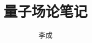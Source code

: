 \documentclass{book}
\author{李成}
\title{\textbf{{\Huge 量子场论笔记}}}
\begin{document}
\maketitle
~\vfill
\tableofcontents

\newpage
{}





\nocite{Arutyunov:NQFT,Peskin:1995ev,Cheng:1984vwu}

\end{document}
